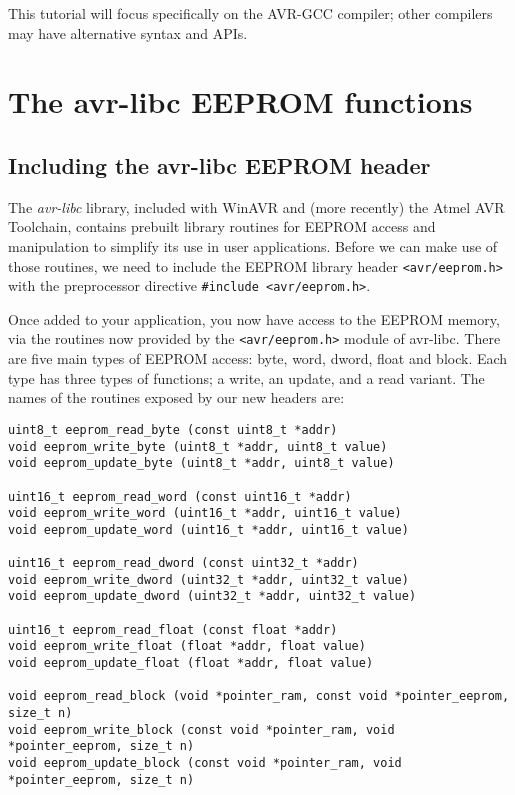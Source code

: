 \documentclass[a4paper,oneside,notitlepage]{book}
\begin{document}
This tutorial will focus specifically on the AVR-GCC compiler; other compilers may have alternative syntax and APIs.


\chapter{The avr-libc EEPROM functions}

\section{Including the avr-libc EEPROM header}

The \textit{avr-libc} library, included with WinAVR and (more recently) the Atmel AVR Toolchain, contains prebuilt library routines for EEPROM access and manipulation to simplify its use in user applications. Before we can make use of those routines, we need to include the EEPROM library header \lstinline{<avr/eeprom.h>} with the preprocessor directive \lstinline{#include <avr/eeprom.h>}.

Once added to your application, you now have access to the EEPROM memory, via the routines now provided by the \lstinline{<avr/eeprom.h>} module of avr-libc. There are five main types of EEPROM access: byte, word, dword, float and block. Each type has three types of functions; a write, an update, and a read variant. The names of the routines exposed by our new headers are:

\begin{center}
\begin{lstlisting}
uint8_t eeprom_read_byte (const uint8_t *addr)
void eeprom_write_byte (uint8_t *addr, uint8_t value)
void eeprom_update_byte (uint8_t *addr, uint8_t value)

uint16_t eeprom_read_word (const uint16_t *addr)
void eeprom_write_word (uint16_t *addr, uint16_t value)
void eeprom_update_word (uint16_t *addr, uint16_t value)

uint16_t eeprom_read_dword (const uint32_t *addr)
void eeprom_write_dword (uint32_t *addr, uint32_t value)
void eeprom_update_dword (uint32_t *addr, uint32_t value)

uint16_t eeprom_read_float (const float *addr)
void eeprom_write_float (float *addr, float value)
void eeprom_update_float (float *addr, float value)

void eeprom_read_block (void *pointer_ram, const void *pointer_eeprom, size_t n)
void eeprom_write_block (const void *pointer_ram, void *pointer_eeprom, size_t n)
void eeprom_update_block (const void *pointer_ram, void *pointer_eeprom, size_t n)
\end{lstlisting}
\end{center}
\end{document}
